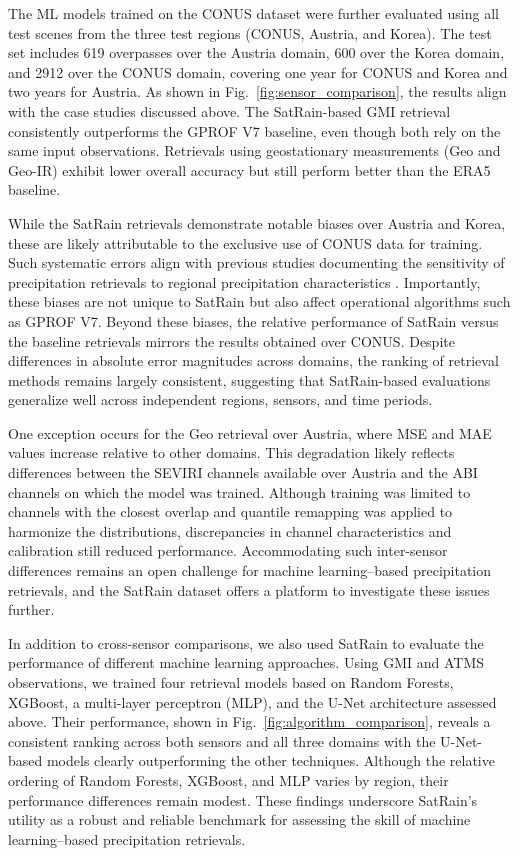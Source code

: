 \documentclass[11pt]{article}
\begin{document}
The ML models trained on the CONUS dataset were further evaluated using all test
scenes from the three test regions (CONUS, Austria, and Korea). The test set
includes 619 overpasses over the Austria domain, 600 over the Korea domain, and 2912
over the CONUS domain, covering one year for CONUS and Korea and two years for
Austria. As shown in Fig.~\ref{fig:sensor_comparison}, the results align with
the case studies discussed above. The SatRain-based GMI retrieval consistently
outperforms the GPROF V7 baseline, even though both rely on the same input
observations. Retrievals using geostationary measurements (Geo and Geo-IR)
exhibit lower overall accuracy but still perform better than the ERA5 baseline.

While the SatRain retrievals demonstrate notable biases over Austria and Korea,
these are likely attributable to the exclusive use of CONUS data for training.
Such systematic errors align with previous studies documenting the sensitivity
of precipitation retrievals to regional precipitation characteristics
\citep{Sohn2013WarmRain}. Importantly, these biases are not unique to SatRain
but also affect operational algorithms such as GPROF V7. Beyond these biases, the
relative performance of SatRain versus the baseline retrievals mirrors the
results obtained over CONUS. Despite differences in absolute error magnitudes
across domains, the ranking of retrieval methods remains largely consistent,
suggesting that SatRain-based evaluations generalize well across independent
regions, sensors, and time periods.

One exception occurs for the Geo retrieval over Austria, where MSE and MAE
values increase relative to other domains. This degradation likely reflects
differences between the SEVIRI channels available over Austria and the ABI
channels on which the model was trained. Although training was limited to
channels with the closest overlap and quantile remapping was applied to
harmonize the distributions, discrepancies in channel characteristics and
calibration still reduced performance. Accommodating such inter-sensor
differences remains an open challenge for machine learning–based precipitation
retrievals, and the SatRain dataset offers a platform to investigate these
issues further.

In addition to cross-sensor comparisons, we also used SatRain to evaluate the
performance of different machine learning approaches. Using GMI and ATMS
observations, we trained four retrieval models based on Random Forests, XGBoost,
a multi-layer perceptron (MLP), and the U-Net architecture assessed above. Their
performance, shown in Fig.~\ref{fig:algorithm_comparison}, reveals a consistent
ranking across both sensors and all three domains with the U-Net-based models
clearly outperforming the other techniques. Although the relative ordering of
Random Forests, XGBoost, and MLP varies by region, their performance differences
remain modest. These findings underscore SatRain’s utility as a robust and
reliable benchmark for assessing the skill of machine learning–based
precipitation retrievals.
\end{document}
